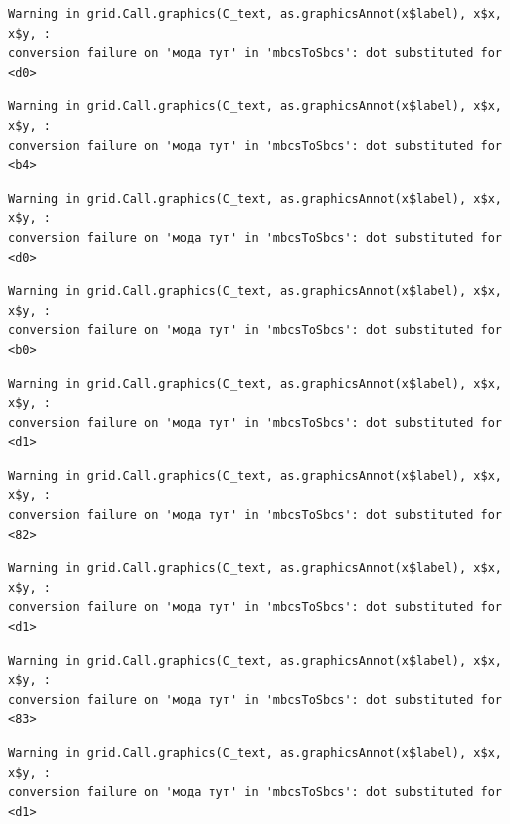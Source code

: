 \documentclass[
  letterpaper,
  DIV=11,
  numbers=noendperiod]{scrreprt}
\theoremstyle{definition}
\theoremstyle{remark}
\begin{document}
\begin{verbatim}
Warning in grid.Call.graphics(C_text, as.graphicsAnnot(x$label), x$x, x$y, :
conversion failure on 'мода тут' in 'mbcsToSbcs': dot substituted for <d0>
\end{verbatim}

\begin{verbatim}
Warning in grid.Call.graphics(C_text, as.graphicsAnnot(x$label), x$x, x$y, :
conversion failure on 'мода тут' in 'mbcsToSbcs': dot substituted for <b4>
\end{verbatim}

\begin{verbatim}
Warning in grid.Call.graphics(C_text, as.graphicsAnnot(x$label), x$x, x$y, :
conversion failure on 'мода тут' in 'mbcsToSbcs': dot substituted for <d0>
\end{verbatim}

\begin{verbatim}
Warning in grid.Call.graphics(C_text, as.graphicsAnnot(x$label), x$x, x$y, :
conversion failure on 'мода тут' in 'mbcsToSbcs': dot substituted for <b0>
\end{verbatim}

\begin{verbatim}
Warning in grid.Call.graphics(C_text, as.graphicsAnnot(x$label), x$x, x$y, :
conversion failure on 'мода тут' in 'mbcsToSbcs': dot substituted for <d1>
\end{verbatim}

\begin{verbatim}
Warning in grid.Call.graphics(C_text, as.graphicsAnnot(x$label), x$x, x$y, :
conversion failure on 'мода тут' in 'mbcsToSbcs': dot substituted for <82>
\end{verbatim}

\begin{verbatim}
Warning in grid.Call.graphics(C_text, as.graphicsAnnot(x$label), x$x, x$y, :
conversion failure on 'мода тут' in 'mbcsToSbcs': dot substituted for <d1>
\end{verbatim}

\begin{verbatim}
Warning in grid.Call.graphics(C_text, as.graphicsAnnot(x$label), x$x, x$y, :
conversion failure on 'мода тут' in 'mbcsToSbcs': dot substituted for <83>
\end{verbatim}

\begin{verbatim}
Warning in grid.Call.graphics(C_text, as.graphicsAnnot(x$label), x$x, x$y, :
conversion failure on 'мода тут' in 'mbcsToSbcs': dot substituted for <d1>
\end{verbatim}
\end{document}
